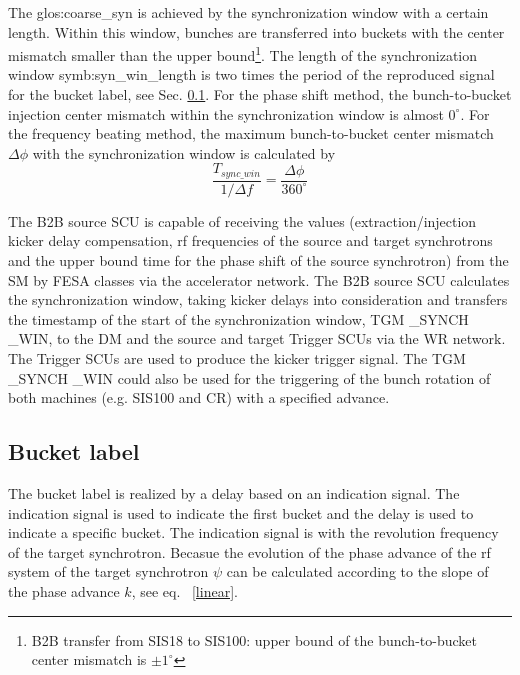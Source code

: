 The \gls{glos:coarse_syn} is achieved by the synchronization window with a certain length. Within this window, bunches are transferred into buckets with the center mismatch smaller than the upper bound\footnote{B2B transfer from SIS18 to SIS100: upper bound of the bunch-to-bucket center mismatch is $\pm1^\circ$}. The length of the synchronization window \gls{symb:syn_win_length} is two times the period of the reproduced signal for the bucket label, see Sec. \ref{sec:bucket_label}. For the phase shift method, the bunch-to-bucket injection center mismatch within the synchronization window is almost $0^\circ$. For the frequency beating method, the maximum bunch-to-bucket center mismatch $\Delta \phi$ with the synchronization window is calculated by 
\begin{equation}
\frac{T_{\mathit{sync\_win}}}{1/\Delta f}= \frac{\Delta \phi}{360^\circ}
\end{equation}

The B2B source SCU is capable of receiving the values (extraction/injection kicker delay compensation, rf frequencies of the source and target synchrotrons and the upper bound time for the phase shift of the source synchrotron) from the SM by FESA classes via the accelerator network. The B2B source SCU calculates the synchronization window, taking kicker delays into consideration and transfers the timestamp of the start of the synchronization window, TGM \_SYNCH \_WIN, to the DM and the source and target Trigger SCUs via the WR network. The Trigger SCUs are used to produce the kicker trigger signal. The TGM \_SYNCH \_WIN could also be used for the triggering of the bunch rotation of both machines (e.g. SIS100 and CR) with a specified advance. 

\subsection{Bucket label}
\label{sec:bucket_label}
The bucket label is realized by a delay based on an indication signal. The indication signal is used to indicate the first bucket and the delay is used to indicate a specific bucket. The indication signal is with the revolution frequency of the target synchrotron. Becasue the evolution of the phase advance of the rf system of the target synchrotron $\psi$ can be calculated according to the slope of the phase advance $k$, see eq. ~\ref{linear}.  

